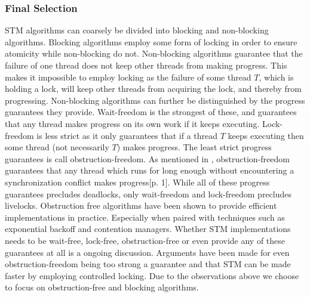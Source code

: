\subsubsection{Final Selection}
\ac{STM} algorithms can coarsely be divided into blocking and non-blocking algorithms\cite[p. 47]{harris2010transactional}. Blocking algorithms employ some form of locking in order to ensure atomicity while non-blocking do not\cite[p. 59]{herlihy2012art}. Non-blocking algorithms guarantee that the failure of one thread does not keep other threads from making progress\cite[p. 47]{harris2010transactional}\cite[p. 142]{herlihy1991wait}\cite[p. 59]{herlihy2012art}. This  makes it impossible to employ locking as the failure of some thread $T$, which is holding a lock, will keep other threads from acquiring the lock, and thereby from progressing. Non-blocking algorithms can further be distinguished by the progress guarantees they provide. Wait-freedom is the strongest of these, and guarantees that any thread makes progress on its own work if it keeps executing\cite[p. 124]{herlihy1991wait}\cite[p. 59]{herlihy2012art}. Lock-freedom is less strict as it only guarantees that if a thread $T$ keeps executing then some thread (not necessarily $T$) makes progress\cite[p. 47]{harris2010transactional}\cite[p. 60]{herlihy2012art}. The least strict progress guarantees is call obstruction-freedom\cite[p. 47]{harris2010transactional}\cite{herlihy2003obstruction}\cite[p. 61]{herlihy2012art}. As mentioned in , obstruction-freedom guarantees that any thread which runs for long enough without encountering a synchronization conflict makes progress\cite{herlihy2003obstruction}[p. 1]. While all of these progress guarantees precludes deadlocks, only wait-freedom and lock-freedom precludes livelocks\cite[p. 47]{harris2010transactional}. Obstruction free algorithms have been shown to provide efficient implementations in practice\cite[p. 61]{herlihy2012art}. Especially when paired with techniques such as exponential backoff\cite[p. 147]{herlihy2012art} and contention managers\cite[p. 51]{harris2010transactional}.  Whether \ac{STM} implementations needs to be wait-free, lock-free, obstruction-free or even provide any of these guarantees at all is a ongoing discussion. Arguments have been made for even obstruction-freedom being too strong a guarantee and that \ac{STM} can be made faster by employing controlled locking\cite{ennals2006software}. Due to the observations above we choose to focus on obstruction-free and blocking algorithms.

